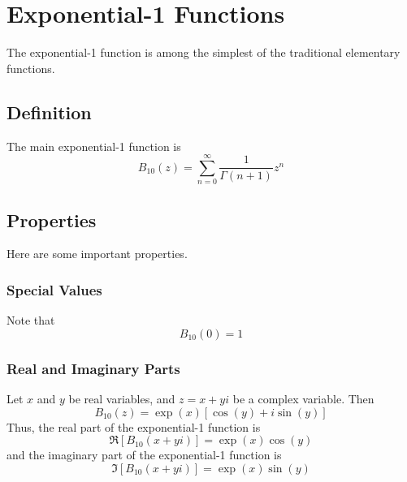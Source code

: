 \chapter{Exponential-1 Functions}
The exponential-1 function is among the simplest of the traditional elementary functions.
\section{Definition}
The main exponential-1 function is
\begin{equation}
    B_{10}(z) = \sum_{n = 0}^{\infty} \frac{1}{\Gamma(n+1)} z^{n}
\end{equation}
\section{Properties}
Here are some important properties.
\subsection{Special Values}
Note that
\begin{equation}
    B_{10}(0) = 1
\end{equation}
\subsection{Real and Imaginary Parts}
Let $x$ and $y$ be real variables, and $z = x + y i$ be a complex variable. Then
\begin{equation}
    B_{10}(z) = \exp({x}) \left[ \cos(y) + i \sin(y) \right]
\end{equation}
Thus, the real part of the exponential-1 function is
\begin{equation}
    \Re\left[ B_{10}(x + y i) \right] = \exp({x}) \cos(y)
\end{equation}
and the imaginary part of the exponential-1 function is
\begin{equation}
    \Im\left[ B_{10}(x + y i) \right] = \exp({x}) \sin(y)
\end{equation}
